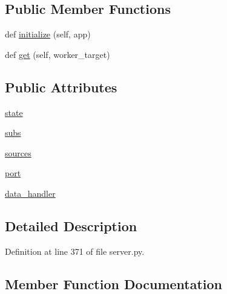 \subsection*{Public Member Functions}
\begin{DoxyCompactItemize}
\item 
def \hyperlink{classparlai_1_1mturk_1_1webapp_1_1server_1_1WorkerHandler_a6e358648dc6628021fe6384d2741c2cc}{initialize} (self, app)
\item 
def \hyperlink{classparlai_1_1mturk_1_1webapp_1_1server_1_1WorkerHandler_ae2d5a8e9e7a62c96f5dd4b4c7cc3190e}{get} (self, worker\+\_\+target)
\end{DoxyCompactItemize}
\subsection*{Public Attributes}
\begin{DoxyCompactItemize}
\item 
\hyperlink{classparlai_1_1mturk_1_1webapp_1_1server_1_1WorkerHandler_af6f56f70aa5d37190629bb460f76f5bf}{state}
\item 
\hyperlink{classparlai_1_1mturk_1_1webapp_1_1server_1_1WorkerHandler_a688a67d4e6ea07a81ac7b122bd1c2c25}{subs}
\item 
\hyperlink{classparlai_1_1mturk_1_1webapp_1_1server_1_1WorkerHandler_a1ea89751b206df02f704b20ec39458ca}{sources}
\item 
\hyperlink{classparlai_1_1mturk_1_1webapp_1_1server_1_1WorkerHandler_aee8590b08e1a2011424d0145473f849e}{port}
\item 
\hyperlink{classparlai_1_1mturk_1_1webapp_1_1server_1_1WorkerHandler_ab9fd59301ef9d35ba692abdbb8e4b0b8}{data\+\_\+handler}
\end{DoxyCompactItemize}


\subsection{Detailed Description}


Definition at line 371 of file server.\+py.



\subsection{Member Function Documentation}
\mbox{\label{classparlai_1_1mturk_1_1webapp_1_1server_1_1WorkerHandler_ae2d5a8e9e7a62c96f5dd4b4c7cc3190e}} 
